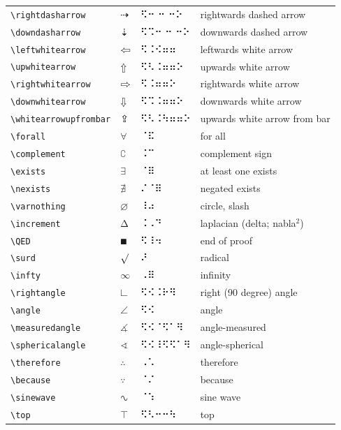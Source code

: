 \documentclass[oneside]{article}
\begin{document}
\begin{longtable}{llll}
\verb|\rightdasharrow| & $\rightdasharrow$ &   ⠫⠒ ⠒ ⠒⠕   & {rightwards dashed arrow} \\[2ex]
\verb|\downdasharrow| & $\downdasharrow$ &   ⠫⠩⠒ ⠒ ⠒⠕   & {downwards dashed arrow} \\[2ex]
\verb|\leftwhitearrow| & $\leftwhitearrow$ &   ⠫⠨⠪⠶⠶   & {leftwards white arrow} \\[2ex]
\verb|\upwhitearrow| & $\upwhitearrow$ &   ⠫⠣⠨⠶⠶⠕   & {upwards white arrow} \\[2ex]
\verb|\rightwhitearrow| & $\rightwhitearrow$ &   ⠫⠨⠶⠶⠕   & {rightwards white arrow} \\[2ex]
\verb|\downwhitearrow| & $\downwhitearrow$ &   ⠫⠩⠨⠶⠶⠕   & {downwards white arrow} \\[2ex]
\verb|\whitearrowupfrombar| & $\whitearrowupfrombar$ &   ⠫⠣⠨⠳⠶⠶⠕   & {upwards white arrow from bar} \\[2ex]
\verb|\forall| & $\forall$ &  ⠈⠯  & {for all} \\[2ex]
\verb|\complement| & $\complement$ &  ⠨⠉  & {complement sign} \\[2ex]
\verb|\exists| & $\exists$ &  ⠈⠿  & {at least one exists} \\[2ex]
\verb|\nexists| & $\nexists$ &  ⠌⠈⠿  & {negated exists} \\[2ex]
\verb|\varnothing| & $\varnothing$ &  ⠸⠴  & {circle, slash} \\[2ex]
\verb|\increment| & $\increment$ &  ⠨⠠⠙  & {laplacian (delta; nabla$^2$)} \\[2ex]
\verb|\QED| & $\QED$ &  ⠫⠸⠲  & {end of proof} \\[2ex]
\verb|\surd| & $\surd$ &  ⠜  & {radical} \\[2ex]
\verb|\infty| & $\infty$ &  ⠠⠿  & {infinity} \\[2ex]
\verb|\rightangle| & $\rightangle$ &  ⠫⠪⠨⠗⠻  & {right (90 degree) angle} \\[2ex]
\verb|\angle| & $\angle$ &  ⠫⠪  & {angle} \\[2ex]
\verb|\measuredangle| & $\measuredangle$ &  ⠫⠪⠈⠫⠁⠻  & {angle-measured} \\[2ex]
\verb|\sphericalangle| & $\sphericalangle$ &  ⠫⠪⠸⠫⠫⠁⠻  & {angle-spherical} \\[2ex]
\verb|\therefore| & $\therefore$ &  ⠠⠡  & {therefore} \\[2ex]
\verb|\because| & $\because$ &  ⠈⠌  & {because} \\[2ex]
\verb|\sinewave| & $\sinewave$ &  ⠈⠱  & {sine wave} \\[2ex]
\verb|\top| & $\top$ &  ⠫⠣⠒⠒⠳  & {top} \\[2ex]

\end{longtable}
\end{document}
